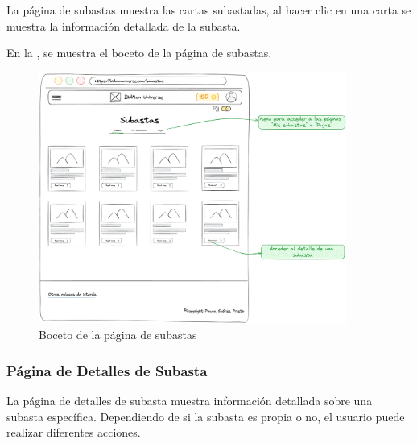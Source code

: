 La página de subastas muestra las cartas subastadas, al hacer clic en una carta se muestra la información detallada de la subasta.

En la , se muestra el boceto de la página de subastas.
\begin{figure}[H]
    \centering
    \includegraphics[width=0.9\textwidth]{figures/6-Analisis/6-Interfaz/prototipos/subastas.png}
    \caption{Boceto de la página de subastas}
    \label{fig:p_auctions}
    \hypertarget{fig:p_auctions}{}
\end{figure}

\subsubsection{Página de Detalles de Subasta}
La página de detalles de subasta muestra información detallada sobre una subasta específica.
Dependiendo de si la subasta es propia o no, el usuario puede realizar diferentes acciones.

